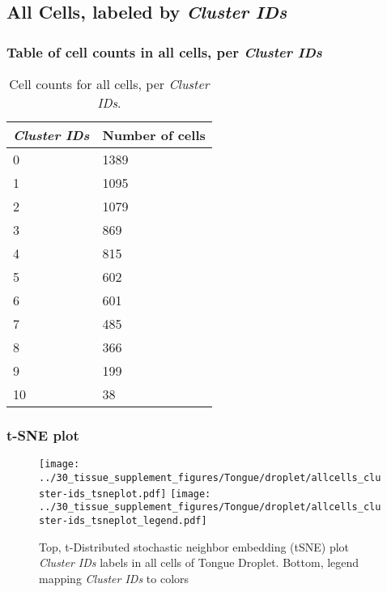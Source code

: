 \clearpage

\subsection{All Cells, labeled by \emph{Cluster IDs}}
\subsubsection{Table of cell counts in all cells, per \emph{Cluster IDs}}\begin{table}[h]
\centering
\label{my-label}
\begin{tabular}{@{}ll@{}}
\toprule

\emph{Cluster IDs}& Number of cells \\ \midrule
0 & 1389 \\

1 & 1095 \\

2 & 1079 \\

3 & 869 \\

4 & 815 \\

5 & 602 \\

6 & 601 \\

7 & 485 \\

8 & 366 \\

9 & 199 \\

10 & 38 \\
\bottomrule
\end{tabular}
\caption{Cell counts for all cells, per \emph{Cluster IDs}.}
\end{table}

\clearpage
\subsubsection{t-SNE plot}
\begin{figure}[h]
\centering
\texttt{[image: ../30\_tissue\_supplement\_figures/Tongue/droplet/allcells\_cluster-ids\_tsneplot.pdf]}
\texttt{[image: ../30\_tissue\_supplement\_figures/Tongue/droplet/allcells\_cluster-ids\_tsneplot\_legend.pdf]}
\caption{Top, t-Distributed stochastic neighbor embedding (tSNE) plot  \emph{Cluster IDs} labels in all cells of Tongue Droplet. Bottom, legend mapping \emph{Cluster IDs} to colors}
\end{figure}


